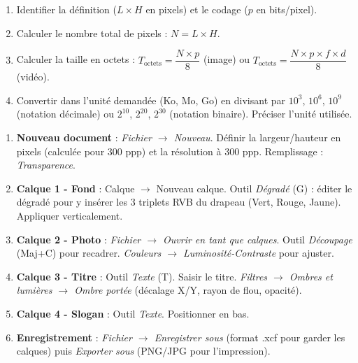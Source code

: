 \documentclass[11pt]{article}
\begin{document}
\begin{methode}
\begin{enumerate}
  \item Identifier la définition ($L \times H$ en pixels) et le codage ($p$ en bits/pixel).
  \item Calculer le nombre total de pixels : $N = L \times H$.
  \item Calculer la taille en octets : $T_{\text{octets}} = \dfrac{N \times p}{8}$ (image) ou $T_{\text{octets}} = \dfrac{N \times p \times f \times d}{8}$ (vidéo).
  \item Convertir dans l'unité demandée (Ko, Mo, Go) en divisant par $10^3$, $10^6$, $10^9$ (notation décimale) ou $2^{10}$, $2^{20}$, $2^{30}$ (notation binaire). Préciser l'unité utilisée.
\end{enumerate}
\end{methode}

\begin{methode}
\begin{enumerate}
  \item \textbf{Nouveau document} : \emph{Fichier $\rightarrow$ Nouveau}. Définir la largeur/hauteur en pixels (calculée pour 300 ppp) et la résolution à 300 ppp. Remplissage : \emph{Transparence}.
  \item \textbf{Calque 1 - Fond} : Calque $\rightarrow$ Nouveau calque. Outil \emph{Dégradé} (G) : éditer le dégradé pour y insérer les 3 triplets RVB du drapeau (Vert, Rouge, Jaune). Appliquer verticalement.
  \item \textbf{Calque 2 - Photo} : \emph{Fichier $\rightarrow$ Ouvrir en tant que calques}. Outil \emph{Découpage} (Maj+C) pour recadrer. \emph{Couleurs $\rightarrow$ Luminosité-Contraste} pour ajuster.
  \item \textbf{Calque 3 - Titre} : Outil \emph{Texte} (T). Saisir le titre. \emph{Filtres $\rightarrow$ Ombres et lumières $\rightarrow$ Ombre portée} (décalage X/Y, rayon de flou, opacité).
  \item \textbf{Calque 4 - Slogan} : Outil \emph{Texte}. Positionner en bas.
  \item \textbf{Enregistrement} : \emph{Fichier $\rightarrow$ Enregistrer sous} (format .xcf pour garder les calques) puis \emph{Exporter sous} (PNG/JPG pour l'impression).
\end{enumerate}
\end{methode}
\end{document}
